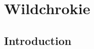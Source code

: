 \chapter{Wildchrokie}
\label{ch:Wildchrokie}


\newcommand{\Ainc}{\textit{A. incana}}
\newcommand{\Ball}{\textit{B. alleghaniensis}}
\newcommand{\Bpap}{\textit{B. papyrifera}}
\newcommand{\Bpop}{\textit{B. populifolia}}





\section*{Introduction}
